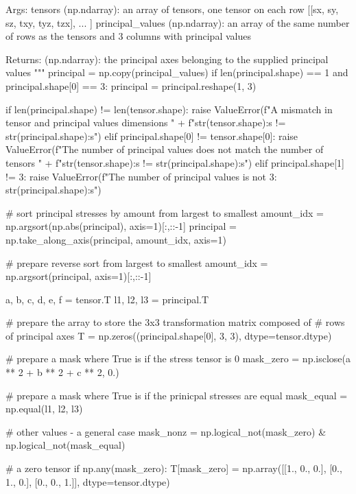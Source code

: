 \begin{itemize}
\begin{python}
    Args:
        tensors (np.ndarray):          an array of tensors, one tensor
                                       on each row
                                       [[sx, sy, sz, txy, tyz, tzx], ... ]
        principal_values (np.ndarray): an array of the same number of rows
                                       as the tensors and 3 columns with
                                       principal values

    Returns:
        (np.ndarray): the principal axes belonging to the supplied
                      principal values
    """
    principal = np.copy(principal_values)
    if len(principal.shape) == 1 and principal.shape[0] == 3:
        principal = principal.reshape(1, 3)

    if len(principal.shape) != len(tensor.shape):
        raise ValueError(f"A mismatch in tensor and principal values dimensions " +
            f"{str(tensor.shape):s} != {str(principal.shape):s}")
    elif principal.shape[0] != tensor.shape[0]:
        raise ValueError(f"The number of principal values does not match the number of tensors " +
            f"{str(tensor.shape):s} != {str(principal.shape):s}")
    elif principal.shape[1] != 3:
        raise ValueError(f"The number of principal values is not 3: {str(principal.shape):s}")

    # sort principal stresses by amount from largest to smallest
    amount_idx = np.argsort(np.abs(principal), axis=1)[:,::-1]
    principal  = np.take_along_axis(principal, amount_idx, axis=1)

    # prepare reverse sort from largest to smallest
    amount_idx = np.argsort(principal, axis=1)[:,::-1]

    a, b, c, d, e, f = tensor.T
    l1, l2, l3 = principal.T

    # prepare the array to store the 3x3 transformation matrix composed of
    # rows of principal axes
    T = np.zeros((principal.shape[0], 3, 3), dtype=tensor.dtype)

    # prepare a mask where True is if the stress tensor is 0
    mask_zero = np.isclose(a ** 2 + b ** 2 + c ** 2, 0.)

    # prepare a mask where True is if the prinicpal stresses are equal
    mask_equal = np.equal(l1, l2, l3)

    # other values - a general case
    mask_nonz  = np.logical_not(mask_zero) & np.logical_not(mask_equal)

    # a zero tensor
    if np.any(mask_zero):
        T[mask_zero] = np.array([[1., 0., 0.], [0., 1., 0.], [0., 0., 1.]], dtype=tensor.dtype)


\end{python}
\end{itemize}
